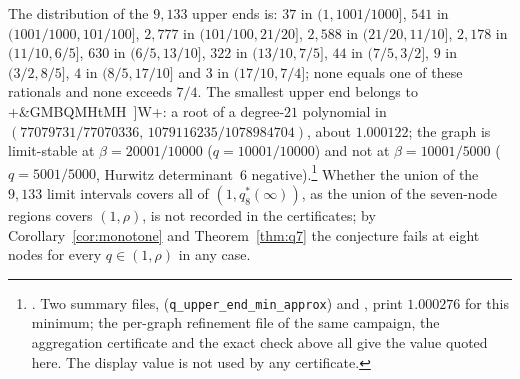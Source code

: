 \documentclass[11pt]{article}
\theoremstyle{definition}
\begin{document}
The distribution of the $9{,}133$ upper ends is: $37$ in $(1,1001/1000]$, $541$ in $(1001/1000,101/100]$, $2{,}777$ in
$(101/100,21/20]$, $2{,}588$ in $(21/20,11/10]$, $2{,}178$ in $(11/10,6/5]$, $630$ in $(6/5,13/10]$, $322$ in $(13/10,7/5]$,
$44$ in $(7/5,3/2]$, $9$ in $(3/2,8/5]$, $4$ in $(8/5,17/10]$ and $3$ in $(17/10,7/4]$; none equals one of these
rationals and none exceeds $7/4$. The smallest upper end belongs to \dsix+&GMBQMHtMH~]W+: a root of a degree-$21$ polynomial in
$(77079731/77070336,\,1079116235/1078984704)$, about $1.000122$; the graph is limit-stable at $\beta=20001/10000$
($q=10001/10000$) and not at $\beta=10001/5000$ ($q=5001/5000$, Hurwitz determinant~6 negative).\footnote{.
Two summary files,  (\texttt{q\_upper\_end\_min\_approx}) and
, print $1.000276$ for this minimum; the per-graph refinement file of the same
campaign, the aggregation certificate and the exact check above all give the value quoted here. The display value is not
used by any certificate.} Whether the union of the $9{,}133$ limit intervals covers all of $(1,q_8^*(\infty))$, as the
union of the seven-node regions covers $(1,\rho)$, is not recorded in the certificates; by Corollary~\ref{cor:monotone}
and Theorem~\ref{thm:q7} the conjecture fails at eight nodes for every $q\in(1,\rho)$ in any case.
\end{document}
